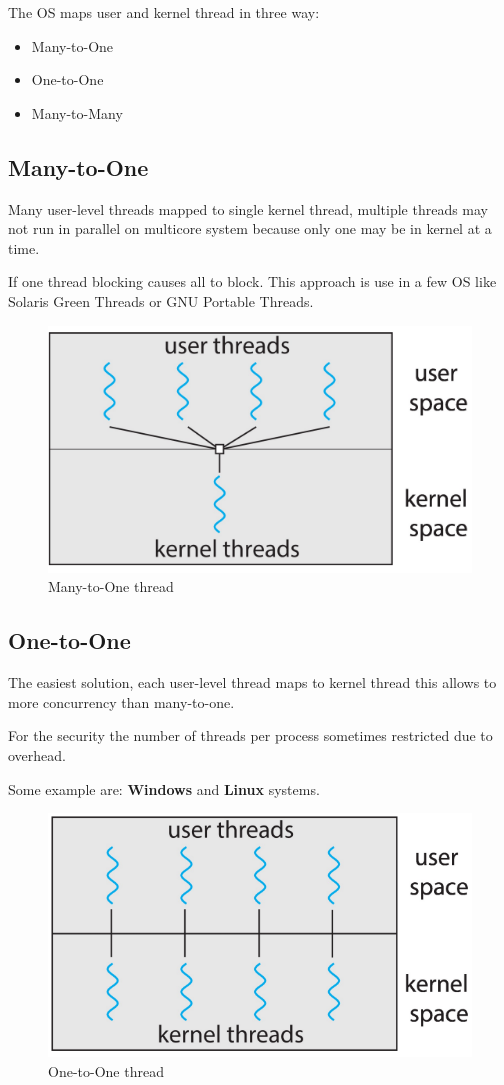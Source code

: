 The OS maps user and kernel thread in three way:

\begin{itemize}
    \item Many-to-One
    \item One-to-One
    \item Many-to-Many
\end{itemize}

\subsection{Many-to-One}

Many user-level threads mapped to single kernel thread, multiple threads may not run in parallel on multicore system because
only one may be in kernel at a time.

If one thread blocking causes all to block. This approach is use in a few OS like Solaris Green Threads or GNU Portable Threads.

\begin{figure}[htbp]
    \centering
    \includegraphics[width=0.5\linewidth]{img/MtM.png}
    \caption{Many-to-One thread}    
\end{figure}

\newpage
\subsection{One-to-One}

The easiest solution, each user-level thread maps to kernel thread this allows to more concurrency than many-to-one.

For the security the number of threads per process sometimes restricted due to overhead.

Some example are: \textbf{Windows} and \textbf{Linux} systems.

\begin{figure}[htbp]
    \centering
    \includegraphics[width=0.5\linewidth]{img/OtO.png}
    \caption{One-to-One thread}    
\end{figure}

